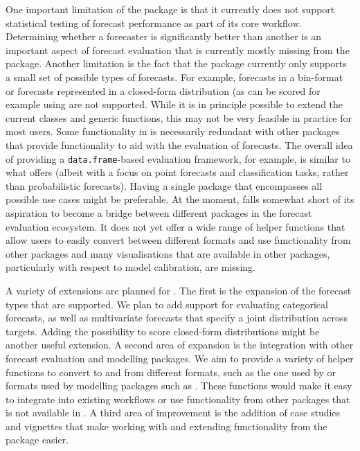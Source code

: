 \documentclass[
]{jss}
\begin{document}
One important limitation of the package is that it currently does not
support statistical testing of forecast performance as part of its core
workflow. Determining whether a forecaster is significantly better than
another is an important aspect of forecast evaluation that is currently
mostly missing from the package. Another limitation is the fact that the
package currently only supports a small set of possible types of
forecasts. For example, forecasts in a bin-format or forecasts
represented in a closed-form distribution (as can be scored for example
using  are not supported. While it is in principle
possible to extend the current classes and generic functions, this may
not be very feasible in practice for most users. Some functionality in
 is necessarily redundant with other packages that
provide functionality to aid with the evaluation of forecasts. The
overall idea of providing a \texttt{data.frame}-based evaluation
framework, for example, is similar to what  offers
(albeit with a focus on point forecasts and classification tasks, rather
than probabilistic forecasts). Having a single package that encompasses
all possible use cases might be preferable. At the moment,
 falls somewhat short of its aspiration to become a
bridge between different packages in the forecast evaluation ecosystem.
It does not yet offer a wide range of helper functions that allow users
to easily convert between different formats and use functionality from
other packages and many visualisations that are available in other
packages, particularly with respect to model calibration, are missing.

A variety of extensions are planned for . The first is
the expansion of the forecast types that are supported. We plan to add
support for evaluating categorical forecasts, as well as multivariate
forecasts that specify a joint distribution across targets. Adding the
possibility to score closed-form distributions might be another useful
extension. A second area of expansion is the integration with other
forecast evaluation and modelling packages. We aim to provide a variety
of helper functions to convert to and from different formats, such as
the one used by  or formats used by modelling packages
such as . These functions would make it easy to integrate
 into existing workflows or use functionality from
other packages that is not available in . A third area
of improvement is the addition of case studies and vignettes that make
working with and extending functionality from the package easier.
\end{document}
